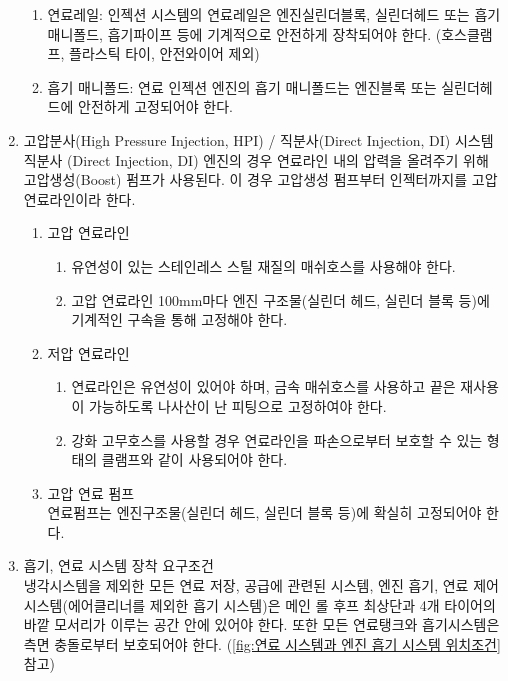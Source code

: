 \documentclass[final,a4paper,10pt]{report}
\begin{document}
\begin{enumerate}
\begin{enumerate}
      \item 연료레일: 인젝션 시스템의 연료레일은 엔진실린더블록, 실린더헤드 또는 흡기 매니폴드, 흡기파이프 등에 기계적으로 안전하게 장착되어야 한다. (호스클램프, 플라스틱 타이, 안전와이어 제외)
      \item 흡기 매니폴드: 연료 인젝션 엔진의 흡기 매니폴드는 엔진블록 또는 실린더헤드에 안전하게 고정되어야 한다.
    \end{enumerate}
    
  \item 고압분사(High Pressure Injection, HPI) / 직분사(Direct Injection, DI) 시스템\\
    직분사 (Direct Injection, DI) 엔진의 경우 연료라인 내의 압력을 올려주기 위해 고압생성(Boost) 펌프가 사용된다. 이 경우 고압생성 펌프부터 인젝터까지를 고압 연료라인이라 한다.
    
    \begin{enumerate}
      \item 고압 연료라인
        \begin{enumerate}
          \item 유연성이 있는 스테인레스 스틸 재질의 매쉬호스를 사용해야 한다.
          \item 고압 연료라인 100mm마다 엔진 구조물(실린더 헤드, 실린더 블록 등)에 기계적인 구속을 통해 고정해야 한다.
        \end{enumerate}
        
      \item 저압 연료라인
        \begin{enumerate}
          \item 연료라인은 유연성이 있어야 하며, 금속 매쉬호스를 사용하고 끝은 재사용이 가능하도록 나사산이 난 피팅으로 고정하여야 한다.
          \item 강화 고무호스를 사용할 경우 연료라인을 파손으로부터 보호할 수 있는 형태의 클램프와 같이 사용되어야 한다.
        \end{enumerate}
        
      \item 고압 연료 펌프\\
        연료펌프는 엔진구조물(실린더 헤드, 실린더 블록 등)에 확실히 고정되어야 한다.
    \end{enumerate}
    
  \item 흡기, 연료 시스템 장착 요구조건\\
    냉각시스템을 제외한 모든 연료 저장, 공급에 관련된 시스템, 엔진 흡기, 연료 제어 시스템(에어클리너를 제외한 흡기 시스템)은 메인 롤 후프 최상단과 4개 타이어의 바깥 모서리가 이루는 공간 안에 있어야 한다. 또한 모든 연료탱크와 흡기시스템은 측면 충돌로부터 보호되어야 한다. (\cref{fig:연료 시스템과 엔진 흡기 시스템 위치조건} 참고)

\end{enumerate}
\end{document}
